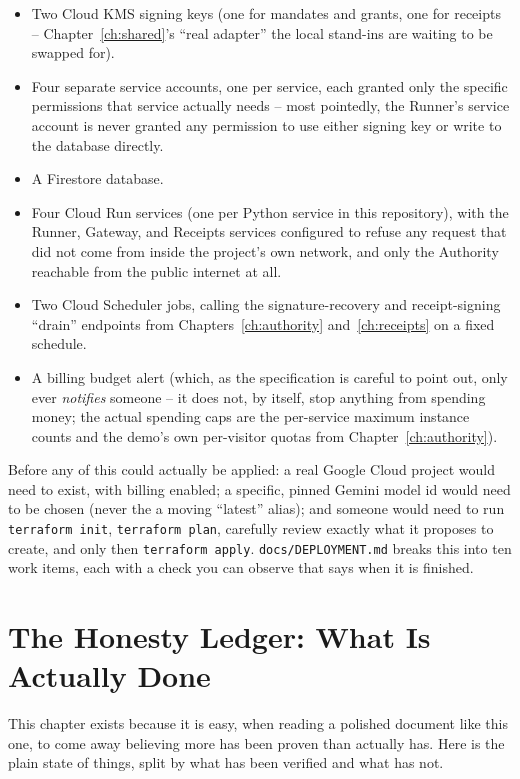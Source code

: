 \documentclass[11pt]{report}
\newcommand{\file}[1]{\texttt{#1}}
\newcommand{\code}[1]{\texttt{#1}}
\begin{document}
\begin{itemize}[leftmargin=2em]
\item Two Cloud KMS signing keys (one for mandates and grants, one for
      receipts -- Chapter~\ref{ch:shared}'s ``real adapter'' the local
      stand-ins are waiting to be swapped for).
\item Four separate service accounts, one per service, each granted only
      the specific permissions that service actually needs -- most
      pointedly, the Runner's service account is never granted any
      permission to use either signing key or write to the database
      directly.
\item A Firestore database.
\item Four Cloud Run services (one per Python service in this
      repository), with the Runner, Gateway, and Receipts services
      configured to refuse any request that did not come from inside the
      project's own network, and only the Authority reachable from the
      public internet at all.
\item Two Cloud Scheduler jobs, calling the signature-recovery and
      receipt-signing ``drain'' endpoints from Chapters~\ref{ch:authority}
      and~\ref{ch:receipts} on a fixed schedule.
\item A billing budget alert (which, as the specification is careful to
      point out, only ever \emph{notifies} someone -- it does not, by
      itself, stop anything from spending money; the actual spending caps
      are the per-service maximum instance counts and the demo's own
      per-visitor quotas from Chapter~\ref{ch:authority}).
\end{itemize}

Before any of this could actually be applied: a real Google Cloud project
would need to exist, with billing enabled; a specific, pinned Gemini model
id would need to be chosen (never the a moving ``latest'' alias); and
someone would need to run \code{terraform init}, \code{terraform plan},
carefully review exactly what it proposes to create, and only then
\code{terraform apply}. \file{docs/DEPLOYMENT.md} breaks this into ten work
items, each with a check you can observe that says when it is finished.

\chapter{The Honesty Ledger: What Is Actually Done}
\label{ch:honesty}

This chapter exists because it is easy, when reading a polished document
like this one, to come away believing more has been proven than actually
has. Here is the plain state of things, split by what has been verified
and what has not.
\end{document}
